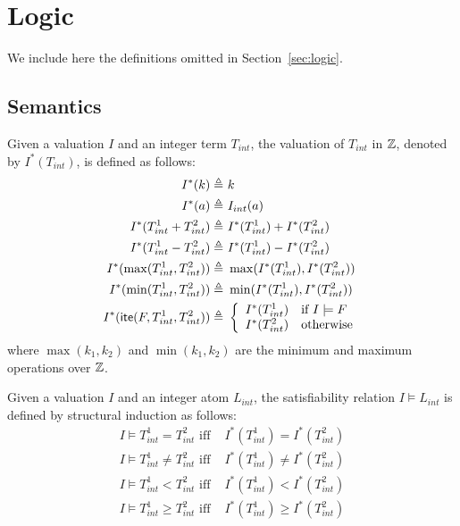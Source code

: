 
\section{Logic \QFBILIA}
\label{app:logic}

We include here the definitions omitted in Section~\ref{sec:logic}.

\subsection{Semantics}

Given a valuation $I$ and an integer term $T_{int}$, the valuation of $T_{int}$ in $\mathbb{Z}$,
denoted by $I^*(T_{int})$, is defined as follows:
\begin{align*}
I^*(k) \triangleq&\ k
\\
I^*(a) \triangleq&\ I_{int}(a)
\\
I^*(T^1_{int} + T^2_{int}) \triangleq&\ I^*(T^1_{int})  + I^*(T^2_{int})
\\
I^*(T^1_{int} - T^2_{int}) \triangleq&\ I^*(T^1_{int})  - I^*(T^2_{int})
\\
I^*(\max(T^1_{int}, T^2_{int})) \triangleq&\ \max(I^*(T^1_{int}), I^*(T^2_{int}))
\\
I^*(\min(T^1_{int}, T^2_{int})) \triangleq&\ \min(I^*(T^1_{int}), I^*(T^2_{int}))
\\
I^*(\textsf{ite}(F, T^1_{int}, T^2_{int})) \triangleq&\
\left\{\begin{array}{ll}
I^*(T^1_{int}) & \mbox{if } I\models F \\
I^*(T^2_{int}) & \mbox{otherwise}
\end{array}\right.
\end{align*}
where $\max(k_1,k_2)$ and $\min(k_1,k_2)$ are the minimum and maximum operations over $\mathbb{Z}$.

Given a valuation $I$ and an integer atom $L_{int}$, the satisfiability relation $I \models L_{int}$ is defined by structural induction as follows:
\begin{align*}
I \models T^1_{int}=T^2_{int} \mbox{ iff }& I^*(T^1_{int}) = I^*(T^2_{int}) \\
I \models T^1_{int}\ne T^2_{int} \mbox{ iff }& I^*(T^1_{int}) \ne I^*(T^2_{int}) \\
I \models T^1_{int} < T^2_{int} \mbox{ iff }& I^*(T^1_{int}) < I^*(T^2_{int}) \\
I \models T^1_{int}\ge T^2_{int} \mbox{ iff }& I^*(T^1_{int}) \ge I^*(T^2_{int})
\end{align*}

